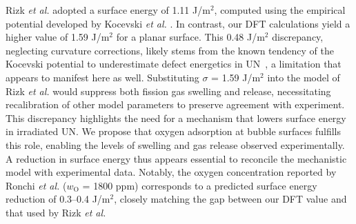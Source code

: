 \documentclass[preprint,12pt,sort&compress]{elsarticle}
\newcommand{\?}{\stackrel{?}{=}}
\begin{document}
Rizk \textit{et al.} adopted a surface energy of 1.11 J/m$^2$, computed using the empirical potential developed by Kocevski \textit{et al.} \cite{Kocevski2022II}. In contrast, our DFT calculations yield a higher value of 1.59 J/m$^2$ for a planar surface. This 0.48 J/m$^2$ discrepancy, neglecting curvature corrections, likely stems from the known tendency of the Kocevski potential to underestimate defect energetics in UN~\cite{AbdulHameed2024}, a limitation that appears to manifest here as well. Substituting $\sigma$ = 1.59 J/m$^2$ into the model of Rizk \textit{et al.} would suppress both fission gas swelling and release, necessitating recalibration of other model parameters to preserve agreement with experiment. This discrepancy highlights the need for a mechanism that lowers surface energy in irradiated UN. We propose that oxygen adsorption at bubble surfaces fulfills this role, enabling the levels of swelling and gas release observed experimentally. A reduction in surface energy thus appears essential to reconcile the mechanistic model with experimental data. Notably, the oxygen concentration reported by Ronchi \textit{et al.} ($w_\text{O}$ = 1800 ppm) corresponds to a predicted surface energy reduction of 0.3--0.4 J/m$^2$, closely matching the gap between our DFT value and that used by Rizk \textit{et al.}

\end{document}
